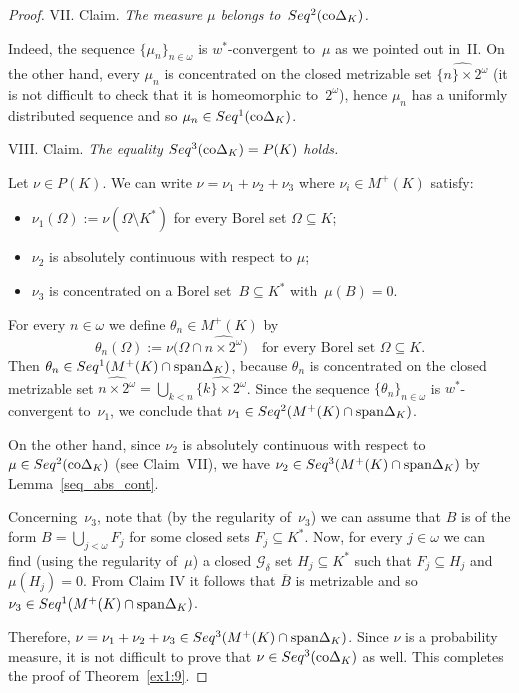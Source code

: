 \documentclass[12pt]{amsart}
\newcommand{\sm}{\setminus}
\newcommand{\sub}{\subseteq}
\newcommand{\lin}{\protect{\rm span}}
\newcommand{\0}{\protect{\bf 0}}
\newcommand{\1}{\protect{\bf 1}}
\theoremstyle{definition}
\theoremstyle{remark}
\numberwithin{equation}{section}
\begin{document}
\begin{proof}
\smallskip

{\sc VII. Claim.} {\em The measure $\mu$ belongs to~$Seq^2({\rm co}\Delta_K)$.}

Indeed, the sequence $\{\mu_n\}_{n\in \omega}$ is $w^*$-convergent to~$\mu$ as we pointed out in~II. 
On the other hand, every $\mu_n$ is concentrated on 
the closed metrizable set $\widehat{\{n\}\times 2^\omega}$ 
(it is not difficult to check that it is homeomorphic to~$2^\omega$), hence
$\mu_n$ has a uniformly distributed sequence and so 
$\mu_n\in Seq^1({\rm co}\Delta_K)$. 


\smallskip

{\sc VIII. Claim.} {\em The equality $Seq^3({\rm co}\Delta_K) = P(K)$ holds.}

Let $\nu \in P(K)$. We can write
$\nu=\nu_1+\nu_2+\nu_3$ where $\nu_i\in M^+(K)$ satisfy:
\begin{itemize}
\item $\nu_1(\Omega):=\nu(\Omega \sm K^*)$ for every Borel set $\Omega \sub K$;
\item $\nu_2$ is absolutely continuous with respect to $\mu$;
\item $\nu_3$ is concentrated on a Borel set~$B \sub K^*$ with~$\mu(B)=0$.
\end{itemize}

For every $n\in \omega$ we define $\theta_n \in M^+(K)$ by 
$$
	\theta_n(\Omega):=\nu\big(\Omega \cap \widehat{n \times 2^\omega}\big)
		\quad
	\mbox{for every Borel set }\Omega \sub K.
$$
Then $\theta_n\in Seq^1(M^+(K)\cap {\rm span}\Delta_K)$, because
$\theta_n$ is concentrated on the closed metrizable set $\widehat{n \times 2^\omega}=\bigcup_{k<n}\widehat{\{k\}\times 2^\omega}$.
Since the sequence $\{\theta_n\}_{n\in \omega}$ is $w^*$-convergent to~$\nu_1$, we conclude that
$\nu_1 \in Seq^2(M^+(K)\cap {\rm span}\Delta_K)$.

On the other hand, since $\nu_2$ is absolutely continuous with respect to~$\mu\in Seq^2({\rm co}\Delta_K)$ (see 
Claim~VII), we have $\nu_2\in Seq^3(M^+(K)\cap\lin\Delta_K)$ by Lemma~\ref{seq_abs_cont}.

Concerning~$\nu_3$, note that (by the regularity of~$\nu_3$) we can assume that $B$ is of the form $B=\bigcup_{j<\omega} F_j$ for some closed
sets $F_j\sub K^*$. Now, for every $j\in \omega$ we can find (using the regularity of~$\mu$) a closed $\mathcal{G}_\delta$ set 
$H_j \sub K^*$ such that $F_j \sub H_j$ and $\mu(H_j)=0$. 
From Claim IV it follows that $\overline{B}$ is metrizable and so $\nu_3\in Seq^1(M^+(K)\cap\lin\Delta_K)$.

Therefore, $\nu=\nu_1+\nu_2+\nu_3 \in Seq^3(M^+(K)\cap\lin\Delta_K)$. Since
$\nu$ is a probability measure, it is not difficult to prove that
$\nu \in Seq^3({\rm co}\Delta_K)$ as well.
This completes the proof of Theorem~\ref{ex1:9}.
\end{proof}
\end{document}
